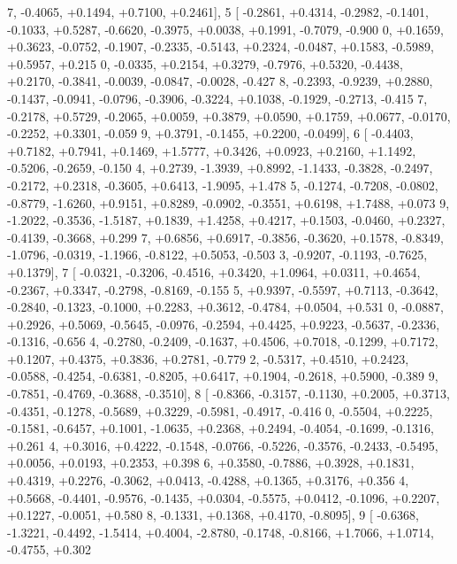 \begin{DoxyCode}
      7, -0.4065, +0.1494, +0.7100, +0.2461],
5 [ -0.2861, +0.4314, -0.2982, -0.1401, -0.1033, +0.5287, -0.6620, -0.3975, +0.0038, +0.1991, -0.7079, -0.900
      0, +0.1659, +0.3623, -0.0752, -0.1907, -0.2335, -0.5143, +0.2324, -0.0487, +0.1583, -0.5989, +0.5957, +0.215
      0, -0.0335, +0.2154, +0.3279, -0.7976, +0.5320, -0.4438, +0.2170, -0.3841, -0.0039, -0.0847, -0.0028, -0.427
      8, -0.2393, -0.9239, +0.2880, -0.1437, -0.0941, -0.0796, -0.3906, -0.3224, +0.1038, -0.1929, -0.2713, -0.415
      7, -0.2178, +0.5729, -0.2065, +0.0059, +0.3879, +0.0590, +0.1759, +0.0677, -0.0170, -0.2252, +0.3301, -0.059
      9, +0.3791, -0.1455, +0.2200, -0.0499],
6 [ -0.4403, +0.7182, +0.7941, +0.1469, +1.5777, +0.3426, +0.0923, +0.2160, +1.1492, -0.5206, -0.2659, -0.150
      4, +0.2739, -1.3939, +0.8992, -1.1433, -0.3828, -0.2497, -0.2172, +0.2318, -0.3605, +0.6413, -1.9095, +1.478
      5, -0.1274, -0.7208, -0.0802, -0.8779, -1.6260, +0.9151, +0.8289, -0.0902, -0.3551, +0.6198, +1.7488, +0.073
      9, -1.2022, -0.3536, -1.5187, +0.1839, +1.4258, +0.4217, +0.1503, -0.0460, +0.2327, -0.4139, -0.3668, +0.299
      7, +0.6856, +0.6917, -0.3856, -0.3620, +0.1578, -0.8349, -1.0796, -0.0319, -1.1966, -0.8122, +0.5053, -0.503
      3, -0.9207, -0.1193, -0.7625, +0.1379],
7 [ -0.0321, -0.3206, -0.4516, +0.3420, +1.0964, +0.0311, +0.4654, -0.2367, +0.3347, -0.2798, -0.8169, -0.155
      5, +0.9397, -0.5597, +0.7113, -0.3642, -0.2840, -0.1323, -0.1000, +0.2283, +0.3612, -0.4784, +0.0504, +0.531
      0, -0.0887, +0.2926, +0.5069, -0.5645, -0.0976, -0.2594, +0.4425, +0.9223, -0.5637, -0.2336, -0.1316, -0.656
      4, -0.2780, -0.2409, -0.1637, +0.4506, +0.7018, -0.1299, +0.7172, +0.1207, +0.4375, +0.3836, +0.2781, -0.779
      2, -0.5317, +0.4510, +0.2423, -0.0588, -0.4254, -0.6381, -0.8205, +0.6417, +0.1904, -0.2618, +0.5900, -0.389
      9, -0.7851, -0.4769, -0.3688, -0.3510],
8 [ -0.8366, -0.3157, -0.1130, +0.2005, +0.3713, -0.4351, -0.1278, -0.5689, +0.3229, -0.5981, -0.4917, -0.416
      0, -0.5504, +0.2225, -0.1581, -0.6457, +0.1001, -1.0635, +0.2368, +0.2494, -0.4054, -0.1699, -0.1316, +0.261
      4, +0.3016, +0.4222, -0.1548, -0.0766, -0.5226, -0.3576, -0.2433, -0.5495, +0.0056, +0.0193, +0.2353, +0.398
      6, +0.3580, -0.7886, +0.3928, +0.1831, +0.4319, +0.2276, -0.3062, +0.0413, -0.4288, +0.1365, +0.3176, +0.356
      4, +0.5668, -0.4401, -0.9576, -0.1435, +0.0304, -0.5575, +0.0412, -0.1096, +0.2207, +0.1227, -0.0051, +0.580
      8, -0.1331, +0.1368, +0.4170, -0.8095],
9 [ -0.6368, -1.3221, -0.4492, -1.5414, +0.4004, -2.8780, -0.1748, -0.8166, +1.7066, +1.0714, -0.4755, +0.302

\end{DoxyCode}
